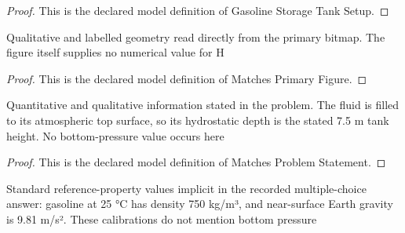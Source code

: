 \begin{proof}
  This is the declared model definition of Gasoline Storage Tank Setup.
\end{proof}
\begin{definition}
  \label{def:physics:phyx-mini-0382:phyxminiproblems-problemphyxmini0382-matchesprimaryfigure}
  Qualitative and labelled geometry read directly from the primary bitmap. The figure itself supplies no numerical value for H
\end{definition}
\begin{proof}
  This is the declared model definition of Matches Primary Figure.
\end{proof}
\begin{definition}
  \label{def:physics:phyx-mini-0382:phyxminiproblems-problemphyxmini0382-matchesproblemstatement}
  Quantitative and qualitative information stated in the problem. The fluid is filled to its atmospheric top surface, so its hydrostatic depth is the stated 7.5 m tank height. No bottom-pressure value occurs here
\end{definition}
\begin{proof}
  This is the declared model definition of Matches Problem Statement.
\end{proof}
\begin{definition}
  \label{def:physics:phyx-mini-0382:phyxminiproblems-problemphyxmini0382-usesreferencegasolineandearthgravity}
  Standard reference-property values implicit in the recorded multiple-choice answer: gasoline at 25 °C has density 750 kg/m³, and near-surface Earth gravity is 9.81 m/s². These calibrations do not mention bottom pressure
\end{definition}
